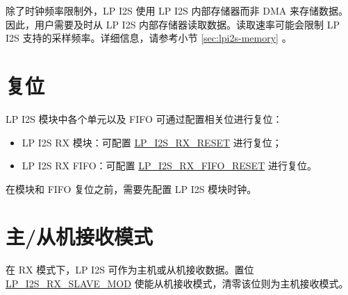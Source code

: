 \documentclass[main\_\_CN.tex]{subfiles}
\begin{document}
除了时钟频率限制外，LP I2S 使用 LP I2S 内部存储器而非 DMA 来存储数据。因此，用户需要及时从 LP I2S 内部存储器读取数据。读取速率可能会限制 LP I2S 支持的采样频率。详细信息，请参考小节 \ref{sec:lpi2s-memory} \textit{}。

\section{复位} \label{sec:lpi2s-reset}

LP I2S 模块中各个单元以及 FIFO 可通过配置相关位进行复位：

\begin{itemize}
    \item LP I2S RX 模块：可配置 \hyperref[fielddesc:LPI2SRXRESET]{LP\_I2S\_RX\_RESET} 进行复位；
    \item LP I2S RX FIFO：可配置 \hyperref[fielddesc:LPI2SRXFIFORESET]{LP\_I2S\_RX\_FIFO\_RESET} 进行复位。
\end{itemize}

\begin{tiplisting}
在模块和 FIFO 复位之前，需要先配置 LP I2S 模块时钟。
\end{tiplisting} 

\section{主/从机接收模式}

在 RX 模式下，LP I2S 可作为主机或从机接收数据。置位 \hyperref[fielddesc:LPI2SRXSLAVEMOD]{LP\_I2S\_RX\_SLAVE\_MOD} 使能从机接收模式，清零该位则为主机接收模式。
\end{document}
